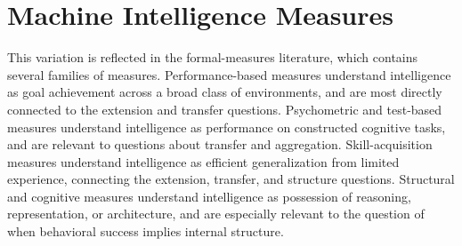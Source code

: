 \chapter{Machine Intelligence Measures}

This variation is reflected in the formal-measures literature, which contains several
families of measures. Performance-based measures understand intelligence as goal
achievement across a broad class of environments, and are most directly connected to the
extension and transfer questions. Psychometric and test-based measures understand
intelligence as performance on constructed cognitive tasks, and are relevant to
questions about transfer and aggregation. Skill-acquisition measures understand
intelligence as efficient generalization from limited experience, connecting the
extension, transfer, and structure questions. Structural and cognitive measures
understand intelligence as possession of reasoning, representation, or architecture, and
are especially relevant to the question of when behavioral success implies internal
structure.

\nocite{Chollet2019}
